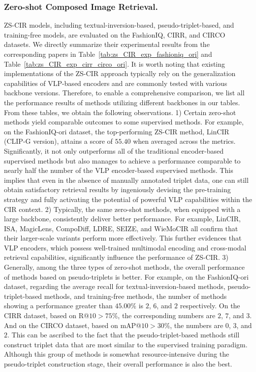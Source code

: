 \subsubsection{Zero-shot Composed Image Retrieval.} ZS-CIR models, including textual-inversion-based, pseudo-triplet-based, and training-free models, are evaluated on the FashionIQ, CIRR, and CIRCO datasets. We directly summarize their experimental results from the corresponding papers in Table~\ref{tab:zs_CIR_exp_fashioniq_ori} and Table~\ref{tab:zs_CIR_exp_cirr_circo_ori}. 
It is worth noting that existing implementations of the ZS-CIR approach typically rely on the generalization capabilities of VLP-based encoders and are commonly tested with various backbone versions. Therefore, to enable a comprehensive comparison, we list all the performance results of methods utilizing different backbones in our tables.
From these tables, we obtain the following observations. 
1) Certain zero-shot methods yield comparable outcomes to some supervised methods. For example, on the FashionIQ-ori dataset, the top-performing ZS-CIR method, LinCIR (CLIP-G version), attains a score of $55.40$ when averaged across the metrics. Significantly, it not only outperforms all of the traditional encoder-based supervised methods but also manages to achieve a performance comparable to nearly half the number of the VLP encoder-based supervised methods. This implies that even in the absence of manually annotated triplet data, one can still obtain satisfactory retrieval results by ingeniously devising the pre-training strategy and fully activating the potential of powerful VLP capabilities within the CIR context.
2) Typically, the same zero-shot methods, when equipped with a large backbone, consistently deliver better performance. %
For example, LinCIR, ISA, MagicLens, CompoDiff, LDRE, SEIZE, and WieMoCIR all confirm that their larger-scale variants perform more effectively. This further evidences that VLP encoders, which possess well-trained multimodal encoding and cross-modal retrieval capabilities, significantly influence the performance of ZS-CIR.
3) Generally, among the three types of zero-shot methods, the overall performance of methods based on pseudo-triplets is better. For example, on the FashionIQ-ori dataset, regarding the average recall for textual-inversion-based methods, pseudo-triplet-based methods, and training-free methods, the number of methods showing a performance greater than $45.00\%$ is $2$, $6$, and $2$ respectively. On the CIRR dataset, based on R@$10 > 75\%$, the corresponding numbers are $2$, $7$, and $3$. And on the CIRCO dataset, based on mAP@$10 > 30\%$, the numbers are $0$, $3$, and $2$. This can be ascribed to the fact that the pseudo-triplet-based methods still construct triplet data that are most similar to the supervised training paradigm. Although this group of methods is somewhat resource-intensive during the pseudo-triplet construction stage, their overall performance is also the best. 


